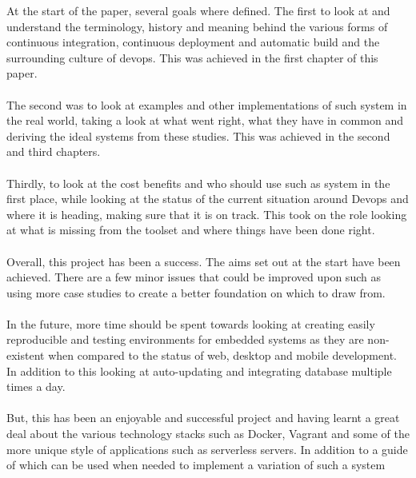 At the start of the paper, several goals where defined. The first to look at and understand the terminology, history and meaning behind the various forms of continuous integration, continuous deployment and automatic build and the surrounding culture of devops. This was achieved in the first chapter of this paper.
\\\\
The second was to look at examples and other implementations of such system in the real world, taking a look at what went right, what they have in common and deriving the ideal systems from these studies. This was achieved in the second and third chapters.
\\\\
Thirdly, to look at the cost benefits and who should use such as system in the first place, while looking at the status of the current situation around Devops and where it is heading, making sure that it is on track. This took on the role looking at what is missing from the toolset and where things have been done right.
\\\\
Overall, this project has been a success. The aims set out at the start have been achieved. There are a few minor issues that could be improved upon such as using more case studies to create a better foundation on which to draw from. 
\\\\
In the future, more time should be spent towards looking at creating easily reproducible and testing environments for embedded systems as they are non-existent when compared to the status of web, desktop and mobile development. In addition to this looking at auto-updating and integrating database multiple times a day.
\\\\
But, this has been an enjoyable and successful project and having learnt a great deal about the various technology stacks such as Docker, Vagrant and some of the more unique style of applications such as serverless servers. In addition to a guide of which can be used when needed to implement a variation of such a system